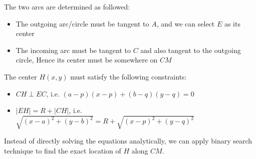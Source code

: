 \documentclass{article}
\begin{document}
The two arcs are determined as followed:

\begin{itemize}
  \item The outgoing arc/circle must be tangent to $A$, and we can select $E$ as its center
  \item The incoming arc must be tangent to $C$ and also tangent to the outgoing circle, 
  Hence its center must be somewhere on $CM$
\end{itemize}
The center $H(x,y)$ must satisfy the following constraints:

\begin{itemize}
  \item $CH \perp EC$, i.e. $(a-p)(x-p) + (b-q)(y-q) = 0$
  \item $|EH| = R + |CH|$, i.e. $\sqrt{(x-a)^2 + (y-b)^2} = R + \sqrt{(x-p)^2 + (y-q)^2}$
\end{itemize}

Instead of directly solving the equations analytically, we can apply binary search technique to find the exact
location of $H$ along $CM$.
\end{document}
